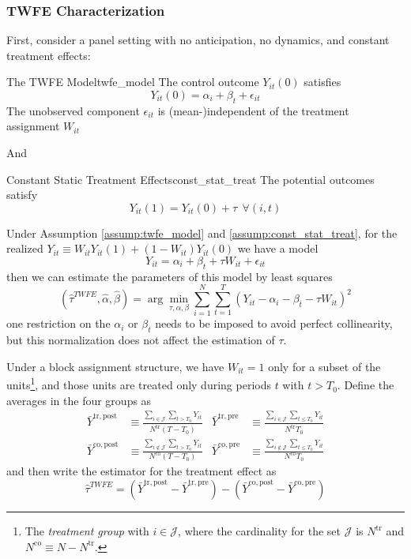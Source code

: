 \documentclass[twoside]{article}
\begin{document}
\subsubsection{TWFE Characterization}
First, consider a panel setting with no anticipation, no dynamics, and constant treatment effects:
\begin{assumption}{The TWFE Model}{twfe_model}
    The control outcome $Y_{it}(0)$ satisfies $$ Y_{it}(0) = \alpha_i + \beta_t + \epsilon_{it} $$
    The unobserved component $\epsilon_{it}$ is (mean-)independent of the treatment assignment $W_{it}$
\end{assumption}
And 
\begin{assumption}{Constant Static Treatment Effects}{const_stat_treat}
    The potential outcomes satisfy $$ Y_{it}(1) = Y_{it}(0) + \tau \ \ \forall (i,t) $$
\end{assumption}
Under Assumption \ref{assump:twfe_model} and \ref{assump:const_stat_treat}, for the realized $Y_{it}\equiv W_{it}Y_{it}(1) + \left(1-W_{it}\right)Y_{it}(0)$ we have a model 
$$ Y_{it} = \alpha_i + \beta_t +\tau W_{it}+\epsilon_{it} $$
then we can estimate the parameters of this model by least squares
\begin{equation*}
    \left(\hat{\tau}^{TWFE},\hat{\alpha},\hat{\beta}\right) = \arg\min_{\tau,\alpha,\beta} \sum^N_{i=1}\sum^T_{t=1} \left(Y_{it}-\alpha_i-\beta_t -\tau W_{it}\right)^2
\end{equation*}
one restriction on the $\alpha_i$ or $\beta_t$ needs to be imposed to avoid perfect collinearity, but this normalization does not affect the estimation of $\tau$.

Under a block assignment structure, we have $W_{it}=1$ only for a subset of the units\footnote{The \textit{treatment group} with $i\in \mathcal{J}$, where the cardinality for the set $\mathcal{J}$ is $N^{\mathrm{tr}}$ and $N^{\mathrm{co}}\equiv N-N^{\mathrm{tr}}$.}, and those units are treated only during periods $t$ with $t>T_0$.
Define the averages in the four groups as 
\begin{align*}
    \bar{Y}^{\mathrm{tr,post}} &\equiv \frac{\sum_{i\in\mathcal{J}}\sum_{t>T_0}Y_{it}}{N^{\mathrm{tr}}\left(T-T_0\right)} & \bar{Y}^{\mathrm{tr,pre}} &\equiv \frac{\sum_{i\in\mathcal{J}}\sum_{t\leq T_0}Y_{it}}{N^{\mathrm{tr}}T_0} \\
    \bar{Y}^{\mathrm{co,post}} &\equiv \frac{\sum_{i\not\in\mathcal{J}}\sum_{t>T_0}Y_{it}}{N^{\mathrm{co}}\left(T-T_0\right)} & \bar{Y}^{\mathrm{co,pre}} &\equiv \frac{\sum_{i\not\in\mathcal{J}}\sum_{t\leq T_0}Y_{it}}{N^{\mathrm{co}}T_0}
\end{align*}
and then write the estimator for the treatment effect as 
\begin{equation*}
    \hat{\tau}^{TWFE} = \left(\bar{Y}^{\mathrm{tr,post}}-\bar{Y}^{\mathrm{tr,pre}}\right) - \left(\bar{Y}^{\mathrm{co,post}}-\bar{Y}^{\mathrm{co,pre}}\right)
\end{equation*}
\end{document}
